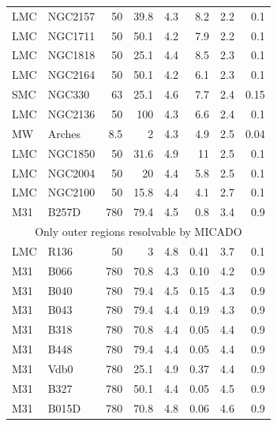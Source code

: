 \begin{table}
\begin{tabular}{l l r r r r r r}
        LMC    & NGC2157      & 50       & 39.8 & 4.3       & 8.2     & 2.2            & 0.1           \\
        LMC    & NGC1711      & 50       & 50.1 & 4.2       & 7.9     & 2.2            & 0.1           \\
        LMC    & NGC1818      & 50       & 25.1 & 4.4       & 8.5     & 2.3            & 0.1           \\
        LMC    & NGC2164      & 50       & 50.1 & 4.2       & 6.1     & 2.3            & 0.1           \\
        SMC    & NGC330       & 63       & 25.1 & 4.6       & 7.7     & 2.4            & 0.15          \\
        LMC    & NGC2136      & 50       & 100  & 4.3       & 6.6     & 2.4            & 0.1           \\
        MW     & Arches       & 8.5      & 2    & 4.3       & 4.9     & 2.5            & 0.04          \\
        LMC    & NGC1850      & 50       & 31.6 & 4.9       & 11      & 2.5            & 0.1           \\
        LMC    & NGC2004      & 50       & 20   & 4.4       & 5.8     & 2.5            & 0.1           \\
        LMC    & NGC2100      & 50       & 15.8 & 4.4       & 4.1     & 2.7            & 0.1           \\
        M31    & B257D        & 780      & 79.4 & 4.5       & 0.8     & 3.4            & 0.9           \\
        \hline
        \multicolumn{8}{c}{Only outer regions resolvable by MICADO}                                    \\
        \hline
        LMC    & R136         & 50       & 3    & 4.8       & 0.41    & 3.7            & 0.1           \\
        M31    & B066         & 780      & 70.8 & 4.3       & 0.10    & 4.2            & 0.9           \\
        M31    & B040         & 780      & 79.4 & 4.5       & 0.15    & 4.3            & 0.9           \\
        M31    & B043         & 780      & 79.4 & 4.4       & 0.19    & 4.3            & 0.9           \\
        M31    & B318         & 780      & 70.8 & 4.4       & 0.05    & 4.4            & 0.9           \\
        M31    & B448         & 780      & 79.4 & 4.4       & 0.05    & 4.4            & 0.9           \\
        M31    & Vdb0         & 780      & 25.1 & 4.9       & 0.37    & 4.4            & 0.9           \\
        M31    & B327         & 780      & 50.1 & 4.4       & 0.05    & 4.5            & 0.9           \\
        M31    & B015D        & 780      & 70.8 & 4.8       & 0.06    & 4.6            & 0.9           \\
        \hline
    \end{tabular}
\end{table}


